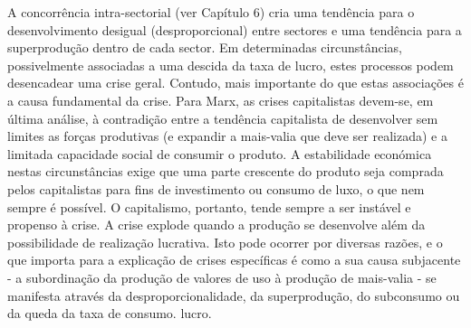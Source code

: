  \par 
A concorrência intra-sectorial (ver Capítulo {\color{blue}6}) cria uma tendência para o desenvolvimento desigual (desproporcional) entre sectores e uma tendência para a superprodução dentro de cada sector. Em determinadas circunstâncias, possivelmente associadas a uma descida da taxa de lucro, estes processos podem desencadear uma crise geral. Contudo, mais importante do que estas associações é a causa fundamental da crise. Para Marx, as crises capitalistas devem-se, em última análise, à contradição entre a tendência capitalista de desenvolver sem limites as forças produtivas (e expandir a mais-valia que deve ser realizada) e a limitada capacidade social de consumir o produto. A estabilidade económica nestas circunstâncias exige que uma parte crescente do produto seja comprada pelos capitalistas para fins de investimento ou consumo de luxo, o que nem sempre é possível. O capitalismo, portanto, tende sempre a ser instável e propenso à crise. A crise explode quando a produção se desenvolve além da possibilidade de realização lucrativa. Isto pode ocorrer por diversas razões, e o que importa para a explicação de crises específicas é como a sua causa subjacente - a subordinação da produção de valores de uso à produção de mais-valia - se manifesta através da desproporcionalidade, da superprodução, do subconsumo ou da queda da taxa de consumo. lucro.
 \par 
